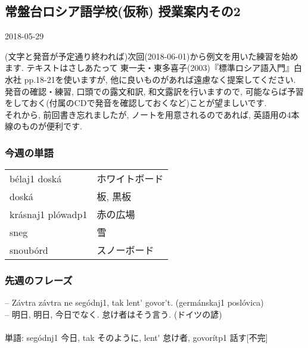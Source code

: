 \documentclass[11pt]{jsarticle}
\begin{document}
\subsection*{常盤台ロシア語学校(仮称) 授業案内その2}
\begin{flushright}
  2018-05-29
\end{flushright}
(文字と発音が予定通り終われば)次回(2018-06-01)から例文を用いた練習を始めます.
テキストはさしあたって 東一夫・東多喜子(2003)『標準ロシア語入門』白水社 pp.18-21を使いますが, 
他に良いものがあれば遠慮なく提案してください.\\
発音の確認・練習, 口頭での露文和訳, 和文露訳を行いますので, 
可能ならば予習をしておく(付属のCDで発音を確認しておくなど)ことが望ましいです.\\
それから, 前回書き忘れましたが, ノートを用意されるのであれば, 英語用の4本線のものが便利です.
\subsubsection*{}
\subsubsection*{今週の単語}
\begin{table}[ht]
  \begin{tabular}{ll}
    b\'ela{j1} dosk\'a & ホワイトボード \\
    dosk\'a & 板, 黒板 \\
    kr\'asna{j1} pl\'owad{p1} & 赤の広場 \\
    sneg & 雪 \\
    snoub\'ord & スノーボード
  \end{tabular}
\end{table}
\subsubsection*{先週のフレーズ}
\noindent
\--- Z\'avtra z\'avtra ne seg\'odn{j1}, tak lent\' govor\'\cyrya t. (germ\'anska{j1} posl\'ovica)\\
\--- 明日, 明日, 今日でなく. 怠け者はそう言う. (ドイツの諺)\\
\\
単語: seg\'odn{j1} 今日, tak そのように, lent\' 怠け者, govor\'it{p1} 話す[不完]
\end{document}
